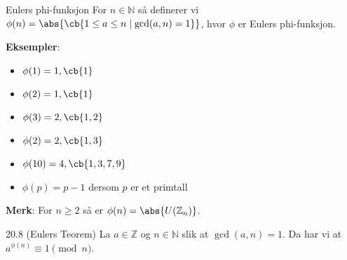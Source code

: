 \begin{definition}{Eulers phi-funksjon}{}
  For $n\in \mathbb{N}$ så definerer vi $\phi(n) = \abs{\cb{1\leq a\leq n\mid \gcd(a,n)=1}}$, 
  hvor $\phi$ er Eulers phi-funksjon.
\end{definition}
\textbf{Eksempler}:
\begin{itemize}
  \item $\phi(1) = 1, \cb{1}$
  \item $\phi(2) = 1, \cb{1}$
  \item $\phi(3) = 2, \cb{1, 2}$
  \item $\phi(2) = 2, \cb{1, 3}$
  \item $\phi(10) = 4, \cb{1, 3, 7, 9}$
  \item $\phi(p) = p-1$ dersom $p$ er et primtall
\end{itemize}
\textbf{Merk}: For $n\geq 2$ så er $\phi(n)=\abs{U(\mathbb{Z}_n)}$.

\begin{theorem*}{20.8 (Eulers Teorem)}{}
  La $a\in \mathbb{Z}$ og $n\in \mathbb{N}$ slik at $\gcd(a, n) = 1$. Da har vi at
  $a^{\phi(n)} \equiv 1 \pmod{n}$. 
\end{theorem*}


